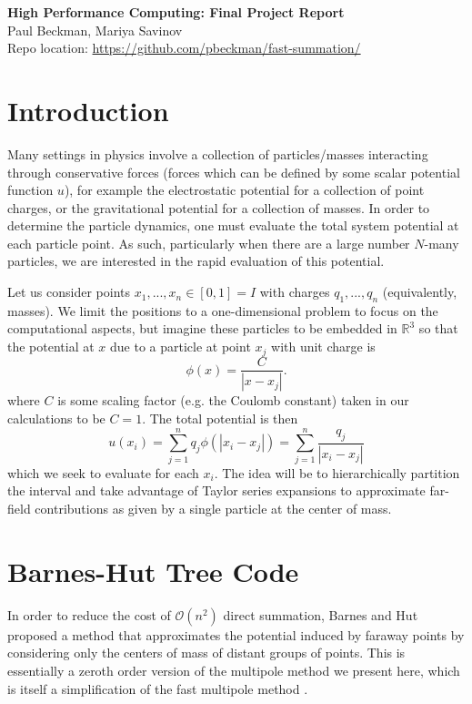 \documentclass{article}
\newcommand{\abs}[1]{\left|#1\right|}
\renewcommand{\O}{\mathcal{O}}
\newcommand{\R}{\mathbb{R}}
\newcommand {\beq} {\begin{equation}}
\newcommand {\eeq} {\end{equation}}
\begin{document}
\begin{center}
{\bf
High Performance Computing: Final Project Report \\
}
Paul Beckman, Mariya Savinov\\
Repo location: \url{https://github.com/pbeckman/fast-summation/}
\end{center}


\section{Introduction}
Many settings in physics involve a collection of particles/masses interacting through conservative forces (forces which can be defined by some scalar potential function $u$), for example the electrostatic potential for a collection of point charges, or the gravitational potential for a collection of masses. In order to determine the particle dynamics, one must evaluate the total system potential at each particle point. As such, particularly when there are a large number $N$-many particles, we are interested in the rapid evaluation of this potential.

Let us consider points $x_1,...,x_n\in[0,1]=I$ with charges $q_1,...,q_n$ (equivalently, masses). We limit the positions to a one-dimensional problem to focus on the computational aspects, but imagine these particles to be embedded in $\R^3$ so that the potential at $x$ due to a particle at point $x_j$ with unit charge is
\beq
        \phi(x) = \frac{C}{\abs{x-x_j}}.
\eeq
where $C$ is some scaling factor (e.g. the Coulomb constant) taken in our calculations to be $C=1$. The total potential is then
\beq
        u(x_i) = \sum_{j=1}^n q_j \phi(\abs{x_i - x_j}) = \sum_{j=1}^n \dfrac{q_j}{\abs{x_i-x_j}}
\label{eq:potential}
\eeq
which we seek to evaluate for each $x_i$. The idea will be to hierarchically partition the interval and take advantage of Taylor series expansions to approximate far-field contributions as given by a single particle at the center of mass.

\section{Barnes-Hut Tree Code}
In order to reduce the cost of $\O(n^2)$ direct summation, Barnes and Hut \cite{barnes1986hierarchical} proposed a method that approximates the potential induced by faraway points by considering only the centers of mass of distant groups of points. This is essentially a zeroth order version of the multipole method we present here, which is itself a simplification of the fast multipole method \cite{greengard1987fast}.
\end{document}
